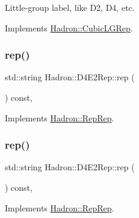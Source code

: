 Little-\/group label, like D2, D4, etc. 

Implements \mbox{\hyperlink{structHadron_1_1CubicLGRep_a9bdb14b519a611d21379ed96a3a9eb41}{Hadron\+::\+Cubic\+L\+G\+Rep}}.

\mbox{\label{structHadron_1_1D4E2Rep_aa3fbc4ce5b4a84a739b17fa4bc49e97d}} 
\subsubsection{\texorpdfstring{rep()}{rep()}\hspace{0.1cm}{\footnotesize\ttfamily [1/5]}}
{\footnotesize\ttfamily std\+::string Hadron\+::\+D4\+E2\+Rep\+::rep (\begin{DoxyParamCaption}{ }\end{DoxyParamCaption}) const\hspace{0.3cm}{\ttfamily [inline]}, {\ttfamily [virtual]}}



Implements \mbox{\hyperlink{structHadron_1_1RepRep_ab3213025f6de249f7095892109575fde}{Hadron\+::\+Rep\+Rep}}.

\mbox{\label{structHadron_1_1D4E2Rep_aa3fbc4ce5b4a84a739b17fa4bc49e97d}} 
\subsubsection{\texorpdfstring{rep()}{rep()}\hspace{0.1cm}{\footnotesize\ttfamily [2/5]}}
{\footnotesize\ttfamily std\+::string Hadron\+::\+D4\+E2\+Rep\+::rep (\begin{DoxyParamCaption}{ }\end{DoxyParamCaption}) const\hspace{0.3cm}{\ttfamily [inline]}, {\ttfamily [virtual]}}



Implements \mbox{\hyperlink{structHadron_1_1RepRep_ab3213025f6de249f7095892109575fde}{Hadron\+::\+Rep\+Rep}}.

\mbox{\label{structHadron_1_1D4E2Rep_aa3fbc4ce5b4a84a739b17fa4bc49e97d}} 
